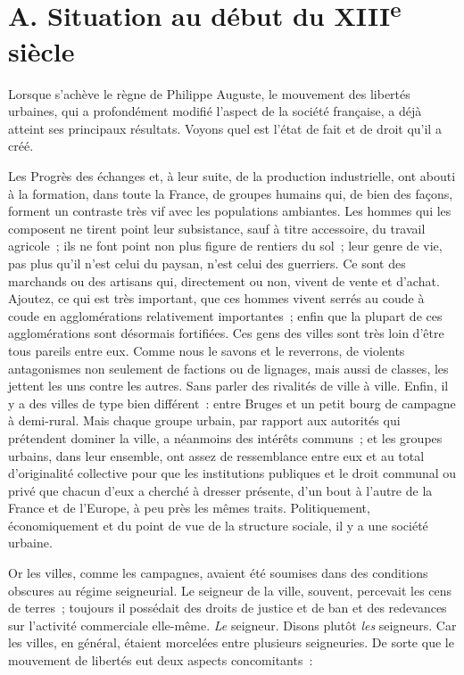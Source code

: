 \documentclass[french,twoside]{book} %
\begin{document}
\section[{A. Situation au début du XIIIe siècle}]{A. Situation au début du XIII\textsuperscript{e} siècle}
\label{c08a}
\noindent  {}
\label{p71} Lorsque s’achève le règne de Philippe Auguste, le mouvement des libertés urbaines, qui a profondément modifié l’aspect de la société française, a déjà atteint ses principaux résultats. Voyons quel est l’état de fait et de droit qu’il a créé.\par
Les Progrès des échanges et, à leur suite, de la production industrielle, ont abouti à la formation, dans toute la France, de groupes humains qui, de bien des façons, forment un contraste très vif avec les populations ambiantes. Les hommes qui les composent ne tirent point leur subsistance, sauf à titre accessoire, du travail agricole ; ils ne font point non plus figure de rentiers du sol ; leur genre de vie, pas plus qu’il n’est celui du paysan, n’est celui des guerriers. Ce sont des marchands ou des artisans qui, directement ou non, vivent de vente et d’achat. Ajoutez, ce qui est très important, que ces hommes vivent serrés au coude à coude en agglomérations relativement importantes ; enfin que la plupart de ces agglomérations sont désormais fortifiées. Ces gens des villes sont très loin d’être tous pareils entre eux. Comme nous le savons et le reverrons, de violents antagonismes non seulement de factions ou de lignages, mais aussi de classes, les jettent les uns contre les autres. Sans parler des rivalités de ville à ville. Enfin, il y a des villes de type bien différent : entre Bruges et un petit bourg de campagne à demi-rural. Mais chaque groupe urbain, par rapport aux autorités qui  
\label{p72} prétendent dominer la ville, a néanmoins des intérêts communs ; et les groupes urbains, dans leur ensemble, ont assez de ressemblance entre eux et au total d’originalité collective pour que les institutions publiques et le droit communal ou privé que chacun d’eux a cherché à dresser présente, d’un bout à l’autre de la France et de l’Europe, à peu près les mêmes traits. Politiquement, économiquement et du point de vue de la structure sociale, il y a une société urbaine.\par
Or les villes, comme les campagnes, avaient été soumises dans des conditions obscures au régime seigneurial. Le seigneur de la ville, souvent, percevait les cens de terres ; toujours il possédait des droits de justice et de ban et des redevances sur l’activité commerciale elle-même. {\itshape Le} seigneur. Disons plutôt {\itshape les} seigneurs. Car les villes, en général, étaient morcelées entre plusieurs seigneuries. De sorte que le mouvement de libertés eut deux aspects concomitants :\par
\end{document}
